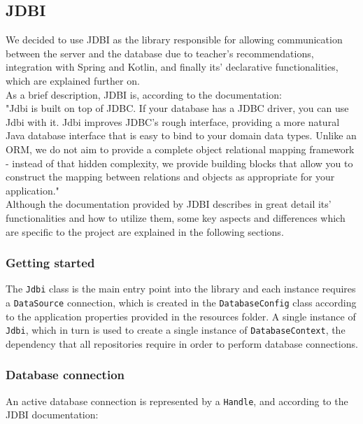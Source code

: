 \subsection{JDBI}

We decided to use JDBI as the library responsible for allowing communication between the server and the database due to teacher's
recommendations, integration with Spring and Kotlin, and finally its' declarative functionalities, which are explained further on.\\

As a brief description, JDBI is, according to the documentation:\\

"Jdbi is built on top of JDBC. If your database has a JDBC driver, you can use Jdbi with it.
Jdbi improves JDBC’s rough interface, providing a more natural Java database interface that is easy to bind to your domain data types.
Unlike an ORM, we do not aim to provide a complete object relational mapping framework - instead of that hidden complexity, we provide
building blocks that allow you to construct the mapping between relations and objects as appropriate for your application."\\

Although the documentation provided by JDBI describes in great detail its' functionalities and how to utilize them,
some key aspects and differences which are specific to the project are explained in the following sections.\\

\subsubsection{Getting started}

The \texttt{Jdbi} class is the main entry point into the library and each instance requires a \texttt{DataSource} connection,
which is created in the \texttt{DatabaseConfig} class according to the application properties provided in the resources folder.
A single instance of \texttt{Jdbi}, which in turn is used to create a single instance of \texttt{DatabaseContext}, the dependency that all
repositories require in order to perform database connections. 

\subsubsection{Database connection}

An active database connection is represented by a \texttt{Handle}, and according to the JDBI documentation:\\

